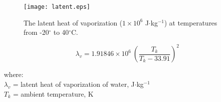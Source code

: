 \begin{figure}[ht!]
    \texttt{[image: latent.eps]}
    \caption{The latent heat of vaporization ($1\times 10^6$ J$\cdot$kg$^{-1}$) at temperatures from -20$^{\circ}$ to 40$^{\circ}$C.}
    \label{fig:latent}
\end{figure}

\begin{equation}
\label{eq:latent}
	\lambda_v = 1.91846\times 10^6\: \left(\frac{T_k}{T_k-33.91}\right)^2
\end{equation}

\noindent where: \\
\indent $\lambda_v$ = latent heat of vaporization of water, J$\cdot$kg$^{-1}$\\
\indent $T_k$ = ambient temperature, K\\


